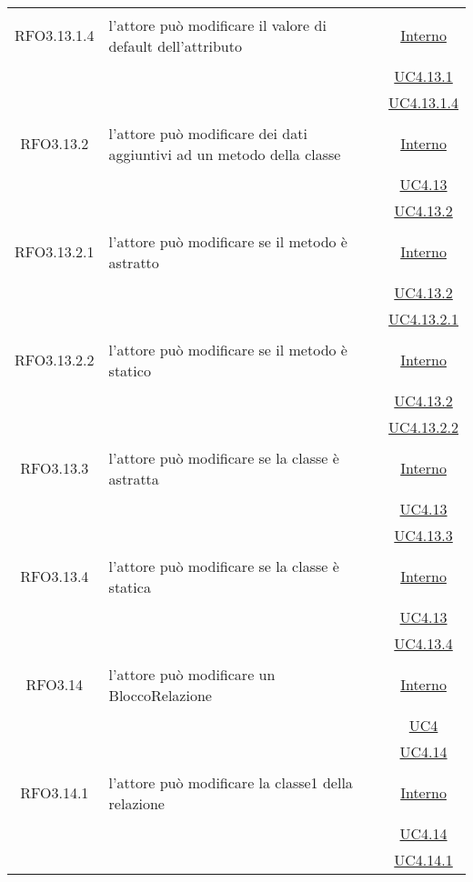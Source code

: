 \begin{longtable}{|c|>{\centering}m{7cm}|c|}
\hypertarget{RFO3.13.1.4}{RFO3.13.1.4} & l'attore può modificare il valore di default dell'attributo & \hyperlink{Interno}{Interno}\\
& &\hyperref[UC4.13.1]{UC4.13.1}\\
& &\hyperref[UC4.13.1.4]{UC4.13.1.4}\\ \hline

\hypertarget{RFO3.13.2}{RFO3.13.2} & l'attore può modificare dei dati aggiuntivi ad un metodo della classe & \hyperlink{Interno}{Interno}\\
& &\hyperref[UC4.13]{UC4.13}\\
& &\hyperref[UC4.13.2]{UC4.13.2}\\ \hline

\hypertarget{RFO3.13.2.1}{RFO3.13.2.1} & l'attore può modificare se il metodo è astratto & \hyperlink{Interno}{Interno}\\
& &\hyperref[UC4.13.2]{UC4.13.2}\\
& &\hyperref[UC4.13.2.1]{UC4.13.2.1}\\ \hline

\hypertarget{RFO3.13.2.2}{RFO3.13.2.2} & l'attore può modificare se il metodo è statico & \hyperlink{Interno}{Interno}\\
& &\hyperref[UC4.13.2]{UC4.13.2}\\
& &\hyperref[UC4.13.2.2]{UC4.13.2.2}\\ \hline%

\hypertarget{RFO3.13.3}{RFO3.13.3} & l'attore può modificare se la classe è astratta & \hyperlink{Interno}{Interno}\\
& &\hyperref[UC4.13]{UC4.13}\\
& &\hyperref[UC4.13.3]{UC4.13.3}\\ \hline

\hypertarget{RFO3.13.4}{RFO3.13.4} & l'attore può modificare se la classe è statica & \hyperlink{Interno}{Interno}\\
& &\hyperref[UC4.13]{UC4.13}\\
& &\hyperref[UC4.13.4]{UC4.13.4}\\ \hline

\hypertarget{RFO3.14}{RFO3.14} & l'attore può modificare un BloccoRelazione &  \hyperlink{Interno}{Interno}\\
& &\hyperref[UC4]{UC4}\\
& &\hyperref[UC4.14]{UC4.14}\\ \hline

\hypertarget{RFO3.14.1}{RFO3.14.1} & l'attore può modificare la classe1 della relazione &  \hyperlink{Interno}{Interno}\\
& &\hyperref[UC4.14]{UC4.14}\\
& &\hyperref[UC4.14.1]{UC4.14.1}\\ \hline


\end{longtable}

